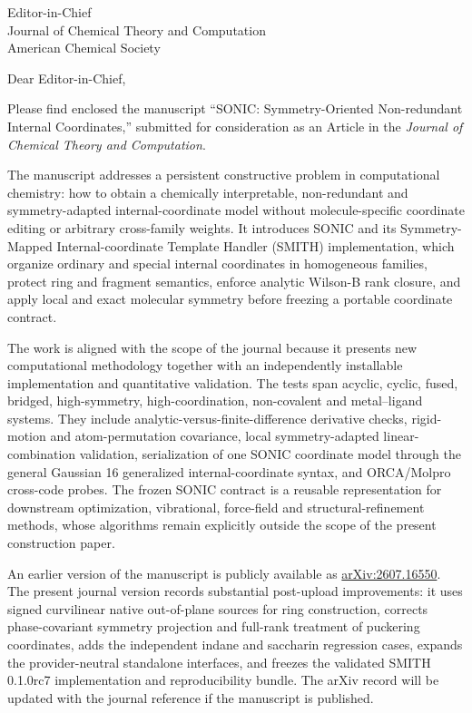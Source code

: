 \documentclass[10pt]{letter}
\begin{document}
\begin{letter}{Editor-in-Chief\\
Journal of Chemical Theory and Computation\\
American Chemical Society}

\opening{Dear Editor-in-Chief,}

Please find enclosed the manuscript ``SONIC: Symmetry-Oriented Non-redundant
Internal Coordinates,'' submitted for consideration as an Article in the
\emph{Journal of Chemical Theory and Computation}.

The manuscript addresses a persistent constructive problem in computational
chemistry: how to obtain a chemically interpretable, non-redundant and
symmetry-adapted internal-coordinate model without molecule-specific coordinate
editing or arbitrary cross-family weights. It introduces SONIC and its
Symmetry-Mapped Internal-coordinate Template Handler (SMITH) implementation,
which organize ordinary and special internal coordinates in
homogeneous families, protect ring and fragment semantics, enforce analytic
Wilson-B rank closure, and apply local and exact molecular symmetry before
freezing a portable coordinate contract.

The work is aligned with the scope of the journal because it presents new computational
methodology together with an independently installable implementation and
quantitative validation. The tests span acyclic, cyclic, fused, bridged,
high-symmetry, high-coordination, non-covalent and metal--ligand systems. They
include analytic-versus-finite-difference derivative checks, rigid-motion and
atom-permutation covariance, local symmetry-adapted linear-combination validation,
serialization of one SONIC coordinate model through the general Gaussian 16
generalized internal-coordinate syntax, and ORCA/Molpro
cross-code probes. The frozen SONIC contract is a
reusable representation for downstream optimization, vibrational, force-field
and structural-refinement methods, whose algorithms remain explicitly outside
the scope of the present construction paper.

An earlier version of the manuscript is publicly available as
\href{https://arxiv.org/abs/2607.16550}{arXiv:2607.16550}. The
present journal version records substantial post-upload improvements: it
uses signed curvilinear native out-of-plane sources for ring construction,
corrects phase-covariant symmetry projection and full-rank treatment of
puckering coordinates, adds the independent indane and saccharin regression
cases, expands the provider-neutral standalone interfaces, and freezes the
validated SMITH 0.1.0rc7 implementation and reproducibility bundle. The arXiv
record will be updated with the journal reference if the manuscript is
published.


\end{letter}
\end{document}
